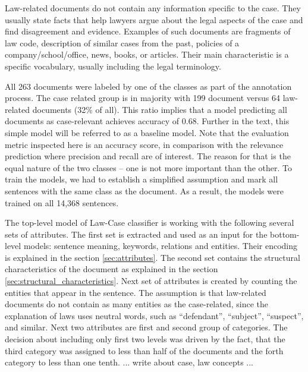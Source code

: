 \documentclass[
  digital, %
  table,   %
  lof,     %
  lot,     %
]{fithesis3}
\begin{document}
Law-related documents do not contain any information specific to the case.
They usually state facts that help lawyers argue about the legal aspects of the case and find disagreement and evidence.
Examples of such documents are fragments of law code, description of similar cases from the past, policies of a company/school/office, news, books, or articles.
Their main characteristic is a specific vocabulary, usually including the legal terminology.

All 263 documents were labeled by one of the classes as part of the annotation process.
The case related group is in majority with 199 document versus 64 law-related documents (32\% of all).
This ratio implies that a model predicting all documents as case-relevant achieves accuracy of 0.68.
Further in the text, this simple model will be referred to as a baseline model.
Note that the evaluation metric inspected here is an accuracy score, in comparison with the relevance prediction where precision and recall are of interest.
The reason for that is the equal nature of the two classes -- one is not more important than the other.
To train the models, we had to establish a simplified assumption and mark all sentences with the same class as the document.
As a result, the models were trained on all 14,368 sentences.

The top-level model of Law-Case classifier is working with the following several sets of attributes.
The first set is extracted and used as an input for the bottom-level models: sentence meaning, keywords, relations and entities.
Their encoding is explained in the section \ref{sec:attributes}.
The second set contains the structural characteristics of the document as explained in the section \ref{sec:structural_characteristics}.
Next set of attributes is created by counting the entities that appear in the sentence.
The assumption is that law-related documents do not contain as many entities as the case-related, since the explanation of laws uses neutral words, such as ``defendant'', ``subject'', ``suspect'', and similar.
Next two attributes are first and second group of categories.
The decision about including only first two levels was driven by the fact, that the third category was assigned to less than half of the documents and the forth category to less than one tenth.
... write about case, law concepts ...
\end{document}
